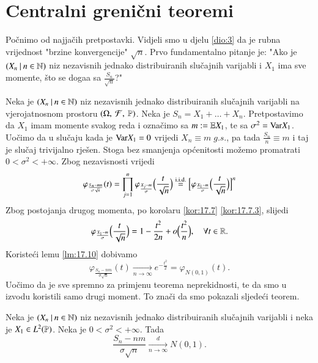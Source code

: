 
\chapter{Centralni greni\v cni teoremi}

Po\v cnimo od najja\v cih pretpostavki.
Vidjeli smo u djelu \ref{dio:3} da je rubna vrijednost "brzine konvergencije" $\sqrt{n}$.
Prvo fundamentalno pitanje je: "Ako je $({X_n} \: | \: {n \in \mathbb{N}})$ niz nezavisnih jednako distribuiranih slu\v cajnih varijabli i $X_1$ ima sve momente, \v sto se doga\dj a sa $\frac{S_n}{\sqrt{n}}$?"

Neka je $({X_n} \: | \: {n \in \mathbb{N}})$ niz nezavisnih jednako distribuiranih slu\v cajnih varijabli na vjerojatnosnom prostoru $(\Omega, \: \mathcal{F}, \: \mathbb{P})$.
Neka je $S_n = X_1 + \ldots + X_n$.
Pretpostavimo da $X_1$ imam momente svakog reda i ozna\v cimo sa $m:= \mathbb{E} X_1$, te sa $\sigma^2 = \mathrm{Var} X_1$.
Uo\v cimo da u slu\v caju kada je $\mathrm{Var} X_1 = 0$ vrijedi $X_n \equiv m \; g.s.$, pa tada $\frac{S_n}{n} \equiv m$ i taj je slu\v caj trivijalno rje\v sen.
Stoga bez smanjenja op\' cenitosti mo\v zemo promatrati $0 < \sigma^2 < +\infty$.
Zbog nezavisnosti vrijedi
\begin{equation*}
    \varphi_{\frac{S_n - m n}{\sigma \sqrt{n}}} (t) = \prod\limits_{j = 1}^{n} \varphi_{\frac{X_j - m}{\sigma}} \Big( \frac{t}{\sqrt{n}} \Big) \overset{\mathrm{i.i.d.}}{=} \Big[ \varphi_{\frac{X_1 - m}{\sigma}} \Big( \frac{t}{\sqrt{n}} \Big) \Big]^n
\end{equation*}
Zbog postojanja drugog momenta, po korolaru \ref{kor:17.7} \ref{kor:17.7.3}, slijedi
\begin{equation*}
    \varphi_{\frac{X_1 - m}{\sigma}} \Big( \frac{t}{\sqrt{n}} \Big) = 1 - \frac{t^2}{2 n} + o \Big( \frac{t^2}{n} \Big), \quad \forall t \in \mathbb{R}.
\end{equation*}
Koriste\' ci lemu \ref{lm:17.10} dobivamo
\begin{equation*}
    \varphi_{\frac{S_n - n m}{\sigma \sqrt{n}}} (t) \xrightarrow[n \to \infty]{} e^{-\frac{t^2}{2}} = \varphi_{N(0,1)} (t).
\end{equation*}
Uo\v cimo da je sve spremno za primjenu teorema neprekidnosti, te da smo u izvodu koristili samo drugi moment.
To zna\v ci da smo pokazali sljede\' ci teorem.

\begin{tm}  \label{tm:19.1}
    \quad \newline
    Neka je $({X_n} \: | \: {n \in \mathbb{N}})$ niz nezavisnih jednako distribuiranih slu\v cajnih varijabli i neka je $X_1 \in L^2 (\mathbb{P})$.
    Neka je $0 < \sigma^2 < +\infty$.
    Tada
    \begin{equation*}
        \frac{S_n - n m}{\sigma \sqrt{n}} \xrightarrow[n \to \infty]{d} N (0, 1).
    \end{equation*}    
\end{tm}

